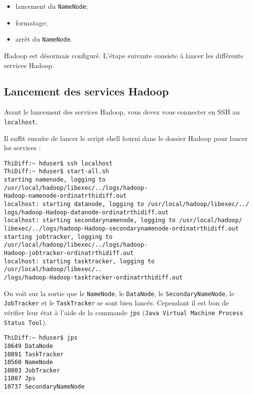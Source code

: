 \begin{itemize}
\item lancement du \texttt{NameNode};
\item formatage;
\item arrêt du \texttt{NameNode}.
\end{itemize}

\par Hadoop est désormais configuré. L'étape suivante consiste à lancer les différents services Hadoop.

\subsection{Lancement des services Hadoop}
\label{sec:start-1.x-demons}

\par Avant le lancement des services Hadoop, vous devez vous connecter en SSH au \texttt{localhost}.

\par Il suffit ensuite de lancer le script shell fourni dans le dossier Hadoop pour lancer les services :

\begin{verbatim}
ThiDiff:~ hduser$ ssh localhost
ThiDiff:~ hduser$ start-all.sh
starting namenode, logging to /usr/local/hadoop/libexec/../logs/hadoop-
Hadoop-namenode-ordinatrthidiff.out
localhost: starting datanode, logging to /usr/local/hadoop/libexec/../
logs/hadoop-Hadoop-datanode-ordinatrthidiff.out
localhost: starting secondarynamenode, logging to /usr/local/hadoop/
libexec/../logs/hadoop-Hadoop-secondarynamenode-ordinatrthidiff.out
starting jobtracker, logging to /usr/local/hadoop/libexec/../logs/hadoop-
Hadoop-jobtracker-ordinatrthidiff.out
localhost: starting tasktracker, logging to /usr/local/hadoop/libexec/..
/logs/hadoop-Hadoop-tasktracker-ordinatrthidiff.out
\end{verbatim}

\par On voit sur la sortie que le \texttt{NameNode}, le \texttt{DataNode}, le \texttt{SecondaryNameNode}, le \texttt{JobTracker} et le \texttt{TaskTracker} se sont bien lancés. Cependant il est bon de vérifier leur état à l'aide de la commande \texttt{jps} (\texttt{Java Virtual Machine Process Status Tool}).

\begin{verbatim}
ThiDiff:~ hduser$ jps
10649 DataNode
10891 TaskTracker
10560 NameNode
10803 JobTracker
11087 Jps
10737 SecondaryNameNode
\end{verbatim}

